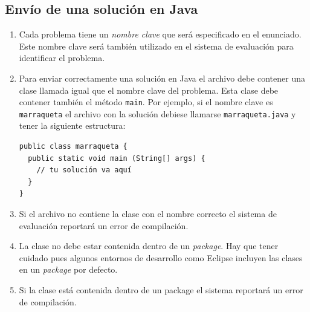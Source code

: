 \documentclass[12pt]{oci}
\begin{document}

\subsection*{Envío de una solución en Java}

\begin{enumerate}
  \item Cada problema tiene un \emph{nombre clave} que será especificado en el
    enunciado.
    Este nombre clave será también utilizado en el sistema de evaluación
    para identificar el problema.
  \item Para enviar correctamente una solución en Java el archivo debe contener
    una clase llamada igual que el nombre clave del problema.
    Esta clase debe contener también el método \verb+main+.
    Por ejemplo, si el nombre clave es \texttt{marraqueta} el archivo con la
    solución debiese llamarse \texttt{marraqueta.java} y tener la siguiente
    estructura:

\begin{verbatim}
public class marraqueta {
  public static void main (String[] args) {
    // tu solución va aquí
  }
}
\end{verbatim}
  \item Si el archivo no contiene la clase con el nombre correcto el sistema de
    evaluación reportará un error de compilación.

  \item La clase no debe estar contenida dentro de un \emph{package}.
      Hay que tener cuidado pues algunos entornos de desarrollo como Eclipse
    incluyen las clases en un \emph{package} por defecto.
  \item Si la clase está contenida dentro de un package el sistema reportará un
    error de compilación.
\end{enumerate}
\end{document}
